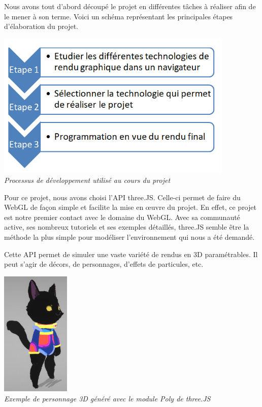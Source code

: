 ﻿Nous avons tout d'abord découpé le projet en différentes tâches à réaliser afin de le mener à son terme. Voici un schéma représentant les principales étapes d'élaboration du projet.

\begin{center}
	\includegraphics[height=7cm]{images/Processus_DEV.png}\\
	\textit{Processus de développement utilisé au cours du projet}\\
\end{center}

\newpage
Pour ce projet, nous avons choisi l'API three.JS. Celle-ci permet de faire du WebGL de façon simple et facilite la mise en œuvre du projet. En effet, ce projet est notre premier contact avec le domaine du WebGL. Avec sa communauté active, ses nombreux tutoriels et ses exemples détaillés, three.JS semble être la méthode la plus simple pour modéliser l'environnement qui nous a été demandé.

Cette API permet de simuler une vaste variété de rendus en 3D paramétrables. Il peut s'agir de décors, de personnages, d'effets de particules, etc.

\begin{center}
	\includegraphics[height=6cm]{images/threeJS_poly_cat.png}\\
	\textit{Exemple de personnage 3D généré avec le module Poly de three.JS}
\end{center}

